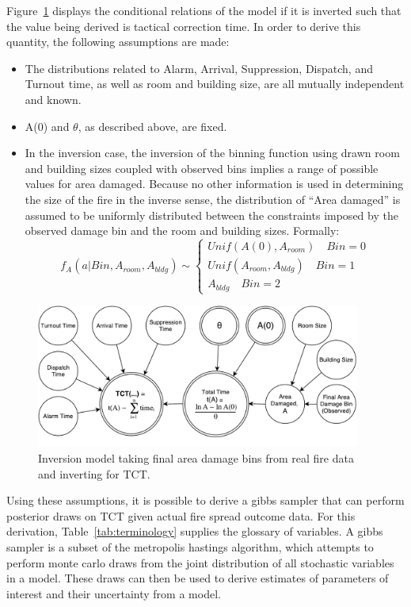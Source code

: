 \documentclass[12pt,oneside]{book}
\begin{document}
Figure~\ref{fig:TCTinverse} displays the conditional relations of the model if it is inverted such that the value being derived is tactical correction time. In order to derive this quantity, the following assumptions are made:
\begin{itemize}
  \item The distributions related to Alarm, Arrival, Suppression, Dispatch, and Turnout time, as well as room and building size, are all mutually independent and known.
  \item A(0) and $\theta$, as described above, are fixed.
  \item In the inversion case, the inversion of the binning function using drawn room and building sizes coupled with observed bins implies a range of possible values for area damaged. Because no other information is used in determining the size of the fire in the inverse sense, the distribution of ``Area damaged''  is assumed to be uniformly distributed between the constraints imposed by the observed damage bin and the room and building sizes. 
    Formally:
    \[f_A(a|Bin,A_{room},A_{bldg}) \sim 
      \begin{cases}
  Unif(A(0),A_{room}) \quad Bin = 0 \\
  Unif(A_{room},A_{bldg}) \quad Bin = 1 \\
  A_{bldg} \quad Bin = 2 
      \end{cases}
    \]
\end{itemize}

\begin{figure}[htb]
  \centering
  \includegraphics[width=0.95\textwidth]{./Figures/TCTinverse}
  \caption{Inversion model taking final area damage bins from real fire data and inverting for TCT.}
  \label{fig:TCTinverse}
\end{figure}

Using these assumptions, it is possible to derive a gibbs sampler that can perform posterior draws on TCT given actual fire spread outcome data. For this derivation, Table~\ref{tab:terminology} supplies the glossary of variables. A gibbs sampler is a subset of the metropolis hastings algorithm, which attempts to perform monte carlo draws from the joint distribution of all stochastic variables in a model. These draws can then be used to derive estimates of parameters of interest and their uncertainty from a model.
\end{document}
